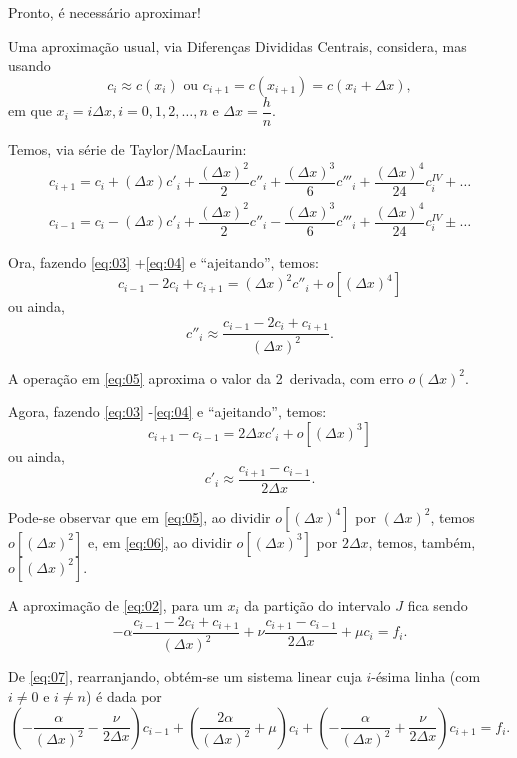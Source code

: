 

Pronto, é necessário aproximar!

Uma aproximação usual, via Diferenças Divididas Centrais, considera, mas usando
\[c_i \approx c(x_i) \mbox{ ou } c_{i+1} = c(x_{i+1}) = c(x_i+\Delta x),\]
em que \(x_i = i \Delta x, i = 0, 1, 2, \ldots, n\) e \(\Delta x = \dfrac{h}{n}\).


Temos, via série de Taylor/MacLaurin:
\begin{eqnarray}
\label{eq:03}
c_{i+1} = c_i + (\Delta x) c'_i + \dfrac{(\Delta x)^2}{2} c''_i + \dfrac{(\Delta x)^3}{6} c'''_i + \dfrac{(\Delta x)^4}{24} c^{IV}_i + \ldots \\
\label{eq:04}
c_{i-1} = c_i - (\Delta x) c'_i + \dfrac{(\Delta x)^2}{2} c''_i - \dfrac{(\Delta x)^3}{6} c'''_i + \dfrac{(\Delta x)^4}{24} c^{IV}_i \pm \ldots
\end{eqnarray}

Ora, fazendo \eqref{eq:03} +\eqref{eq:04} e ``ajeitando'', temos:
\[c_{i-1} -2 c_{i} + c_{i+1} = (\Delta x)^2c''_i + o[(\Delta x)^4]\]
ou ainda,
\begin{equation}
\label{eq:05}
c''_i \approx \dfrac{c_{i-1} -2c_i+c_{i+1}}{(\Delta x)^2}.
\end{equation}

A operação em \eqref{eq:05} aproxima o valor da 2\textordfeminine\ derivada, com erro \(o(\Delta x)^2\).

Agora, fazendo \eqref{eq:03} -\eqref{eq:04} e ``ajeitando'', temos:
\[c_{i+1} - c_{i-1} = 2\Delta x c'_i + o[(\Delta x)^3]\]
ou ainda,
\begin{equation}
\label{eq:06}
c'_i \approx \dfrac{c_{i+1} - c_{i-1}}{2 \Delta x}.
\end{equation}

Pode-se observar que em \eqref{eq:05}, ao dividir \(o[(\Delta x)^4]\) por \((\Delta x)^2\), temos \(o[(\Delta x)^2]\) e, em \eqref{eq:06}, ao dividir \(o[(\Delta x)^3]\) por \(2 \Delta x\), temos, também, \(o[(\Delta x)^2]\).

A aproximação de \eqref{eq:02}, para um \(x_i\) da partição do intervalo \(J\) fica sendo
\begin{equation}
\label{eq:07}
-\alpha \dfrac{c_{i-1} -2c_i+c_{i+1}}{(\Delta x)^2} + \nu \dfrac{c_{i+1} - c_{i-1}}{2 \Delta x} + \mu c_i = f_i.
\end{equation}

De \eqref{eq:07}, rearranjando, obtém-se um sistema linear cuja \(i\)-ésima linha (com \(i \ne 0\) e \(i \ne n\)) é dada por
\begin{equation}
\label{eq:08}
\left(-\dfrac{\alpha}{(\Delta x)^2} - \dfrac{\nu}{2\Delta x}\right) c_{i-1} +
\left(\dfrac{2\alpha}{(\Delta x)^2} + \mu \right) c_{i} + 
\left(-\dfrac{\alpha}{(\Delta x)^2} + \dfrac{\nu}{2\Delta x}\right) c_{i+1} = f_i.
\end{equation}


